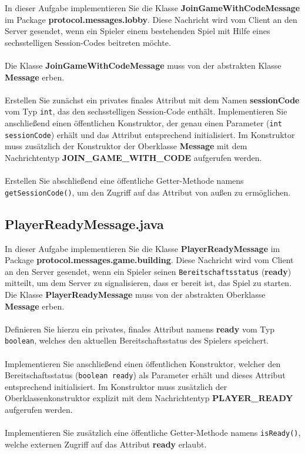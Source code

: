 \documentclass[12pt]{article}
\begin{document}
In dieser Aufgabe implementieren Sie die Klasse \textbf{JoinGameWithCodeMessage} im Package \textbf{protocol.messages.lobby}. Diese Nachricht wird vom Client an den Server gesendet, wenn ein Spieler einem bestehenden Spiel mit Hilfe eines sechsstelligen Session-Codes beitreten möchte.
\\ \\
Die Klasse \textbf{JoinGameWithCodeMessage} muss von der abstrakten Klasse \textbf{Message} erben.
\\ \\
Erstellen Sie zunächst ein privates finales Attribut mit dem Namen \textbf{sessionCode} vom Typ \texttt{int}, das den sechsstelligen Session-Code enthält. Implementieren Sie anschließend einen öffentlichen Konstruktor, der genau einen Parameter (\texttt{int sessionCode}) erhält und das Attribut entsprechend initialisiert. Im Konstruktor muss zusätzlich der Konstruktor der Oberklasse \textbf{Message} mit dem Nachrichtentyp \textbf{JOIN\_GAME\_WITH\_CODE} aufgerufen werden.
\\ \\
Erstellen Sie abschließend eine öffentliche Getter-Methode namens \texttt{getSessionCode()}, um den Zugriff auf das Attribut von außen zu ermöglichen.

\subsection*{PlayerReadyMessage.java}

In dieser Aufgabe implementieren Sie die Klasse \textbf{PlayerReadyMessage} im Package \textbf{protocol.messages.game.building}. Diese Nachricht wird vom Client an den Server gesendet, wenn ein Spieler seinen \texttt{Bereitschaftsstatus} (\textbf{ready}) mitteilt, um dem Server zu signalisieren, dass er bereit ist, das Spiel zu starten. Die Klasse \textbf{PlayerReadyMessage} muss von der abstrakten Oberklasse \textbf{Message} erben.
\\ \\
Definieren Sie hierzu ein privates, finales Attribut namens \textbf{ready} vom Typ \texttt{boolean}, welches den aktuellen Bereitschaftsstatus des Spielers speichert.
\\ \\
Implementieren Sie anschließend einen öffentlichen Konstruktor, welcher den Bereitschaftsstatus (\texttt{boolean ready}) als Parameter erhält und dieses Attribut entsprechend initialisiert. Im Konstruktor muss zusätzlich der Oberklassenkonstruktor explizit mit dem Nachrichtentyp \textbf{PLAYER\_READY} aufgerufen werden.
\\ \\
Implementieren Sie zusätzlich eine öffentliche Getter-Methode namens \texttt{isReady()}, welche externen Zugriff auf das Attribut \textbf{ready} erlaubt.
\end{document}
